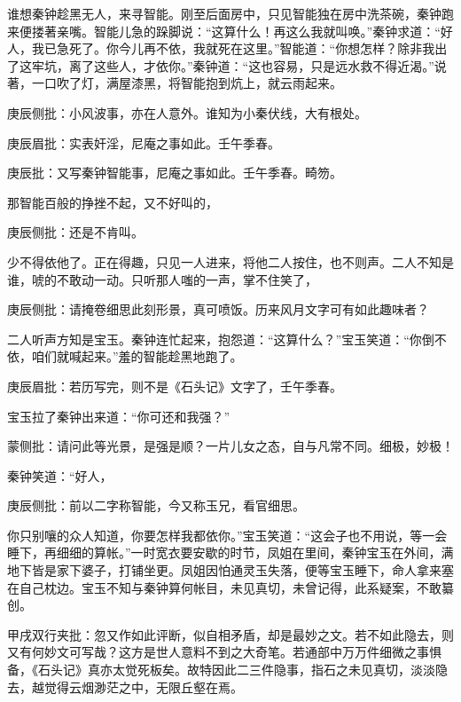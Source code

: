 \begin{parag}

    谁想秦钟趁黑无人，来寻智能。刚至后面房中，只见智能独在房中洗茶碗，秦钟跑来便搂著亲嘴。智能儿急的跺脚说：“这算什么！再这么我就叫唤。”秦钟求道：“好人，我已急死了。你今儿再不依，我就死在这里。”智能道：“你想怎样？除非我出了这牢坑，离了这些人，才依你。”秦钟道：“这也容易，只是远水救不得近渴。”说著，一口吹了灯，满屋漆黑，将智能抱到炕上，就云雨起来。\begin{note}庚辰侧批：小风波事，亦在人意外。谁知为小秦伏线，大有根处。\end{note}\begin{note}庚辰眉批：实表奸淫，尼庵之事如此。壬午季春。\end{note}\begin{note}庚辰批：又写秦钟智能事，尼庵之事如此。壬午季春。畸笏。\end{note}那智能百般的挣挫不起，又不好叫的，\begin{note}庚辰侧批：还是不肯叫。\end{note}少不得依他了。正在得趣，只见一人进来，将他二人按住，也不则声。二人不知是谁，唬的不敢动一动。只听那人嗤的一声，掌不住笑了，\begin{note}庚辰侧批：请掩卷细思此刻形景，真可喷饭。历来风月文字可有如此趣味者？\end{note}二人听声方知是宝玉。秦钟连忙起来，抱怨道：“这算什么？”宝玉笑道：“你倒不依，咱们就喊起来。”羞的智能趁黑地跑了。\begin{note}庚辰眉批：若历写完，则不是《石头记》文字了，壬午季春。\end{note}宝玉拉了秦钟出来道：“你可还和我强？”\begin{note}蒙侧批：请问此等光景，是强是顺？一片儿女之态，自与凡常不同。细极，妙极！\end{note}秦钟笑道：“好人，\begin{note}庚辰侧批：前以二字称智能，今又称玉兄，看官细思。\end{note}你只别嚷的众人知道，你要怎样我都依你。”宝玉笑道：“这会子也不用说，等一会睡下，再细细的算帐。”一时宽衣要安歇的时节，凤姐在里间，秦钟宝玉在外间，满地下皆是家下婆子，打铺坐更。凤姐因怕通灵玉失落，便等宝玉睡下，命人拿来塞在自己枕边。宝玉不知与秦钟算何帐目，未见真切，未曾记得，此系疑案，不敢纂创。\begin{note}甲戌双行夹批：忽又作如此评断，似自相矛盾，却是最妙之文。若不如此隐去，则又有何妙文可写哉？这方是世人意料不到之大奇笔。若通部中万万件细微之事惧备，《石头记》真亦太觉死板矣。故特因此二三件隐事，指石之未见真切，淡淡隐去，越觉得云烟渺茫之中，无限丘壑在焉。\end{note}
\end{parag}


